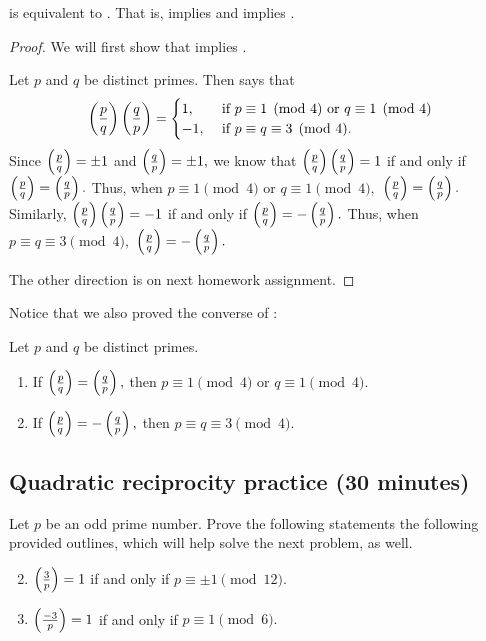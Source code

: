 \documentclass{ximera}
\begin{document}
\begin{proposition}
  is equivalent to . That is,  implies  and  implies  .
\end{proposition}
\begin{proof}
	We will first show that  implies .
	
	Let $p$ and $q$ be distinct primes.  Then  says that 
	\[
		\left(\frac{p}{q}\right)\left(\frac{q}{p}\right)=
			\begin{cases}
 				1, & \textnormal{ if } p\equiv 1\pmod{4} \textnormal{ or } q\equiv 1\pmod{4}\\
				-1, & \textnormal{ if } p\equiv q\equiv 3\pmod{4}.
			\end{cases}
	\]
	Since $\left(\frac{p}{q}\right)=\pm 1$ and $\left(\frac{q}{p}\right)=\pm 1,$ we know that $\left(\frac{p}{q}\right)\left(\frac{q}{p}\right)=1$ if and only if $\left(\frac{p}{q}\right)=\left(\frac{q}{p}\right).$ Thus, when $p\equiv 1\pmod{4}$ or $q\equiv 1\pmod{4},$ $\left(\frac{p}{q}\right)=\left(\frac{q}{p}\right).$ Similarly, $\left(\frac{p}{q}\right)\left(\frac{q}{p}\right)=-1$ if and only if $\left(\frac{p}{q}\right)=-\left(\frac{q}{p}\right).$ Thus, when $p\equiv q\equiv 3\pmod{4},$ $\left(\frac{p}{q}\right)=-\left(\frac{q}{p}\right).$ 
	
	The other direction is on next homework assignment.
\end{proof}

Notice that we also proved the converse of :
\begin{corollary}\label{cor:quad-rec}
	Let $p$ and $q$ be distinct primes.  
	\begin{enumerate}[label=(\alph*)]
		\item If $\left(\frac{p}{q}\right)=\left(\frac{q}{p}\right),$ then $p\equiv 1 \pmod{4}$ or $q\equiv 1\pmod{4}.$
 		\item If $\left(\frac{p}{q}\right)=-\left(\frac{q}{p}\right),$ then $p\equiv q \equiv 3 \pmod{4}.$
	\end{enumerate}
\end{corollary}


\subsection{Quadratic reciprocity practice (30 minutes)}

\begin{br}
	Let $p$ be an odd prime number. Prove the following statements the following provided outlines, which will help solve the next problem, as well.
	
	\begin{enumerate}[label=(\alph*)]
	\setcounter{enumi}{1}
		\item $\left(\frac{3}{p}\right)=1$ if and only if $p\equiv \pm1\pmod{12}.$
		\item $\left(\frac{-3}{p}\right)=1$ if and only if $p\equiv 1\pmod{6}.$	
	\end{enumerate}
\end{br}
\end{document}
